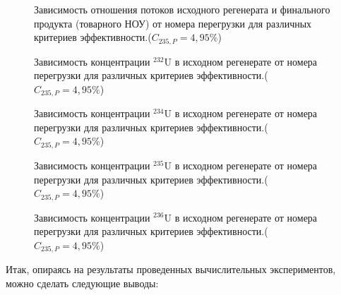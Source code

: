 \begin{figure}[ht]
    \centering
    
    \caption{Зависимость отношения потоков исходного регенерата и финального продукта (товарного НОУ) от номера перегрузки для различных критериев эффективности.($C_{235,{P}}=4,95\%$)}\label{7}
\end{figure}

\begin{figure}[ht]
    \centering
    \begin{minipage}{.5\textwidth}
      \centering
      
      \caption{{Зависимость концентрации $^{232}$U в исходном регенерате от номера перегрузки для различных критериев эффективности.($C_{235,{P}}=4,95\%$){\label{8}}}}
    \end{minipage}%
    \begin{minipage}{.5\textwidth}
      \centering
      
\caption{{Зависимость концентрации $^{234}$U в исходном регенерате от номера перегрузки для различных критериев эффективности.($C_{235,{P}}=4,95\%$){\label{9}}}}
\end{minipage}
\end{figure}

\begin{figure}[ht]
    \centering
    \begin{minipage}{.5\textwidth}
      \centering
      
      \caption{{Зависимость концентрации $^{235}$U в исходном регенерате от номера перегрузки для различных критериев эффективности.($C_{235,{P}}=4,95\%$){\label{10}}}}
    \end{minipage}%
    \begin{minipage}{.5\textwidth}
      \centering
      
\caption{{Зависимость концентрации $^{236}$U в исходном регенерате от номера перегрузки для различных критериев эффективности.($C_{235,{P}}=4,95\%$){\label{11}}}}
\end{minipage}
\end{figure}


Итак, опираясь на результаты проведенных вычислительных экспериментов, можно сделать следующие выводы:

